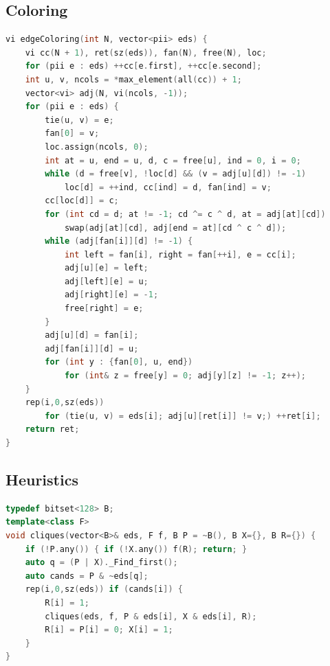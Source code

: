 \begin{multicols}{\Columns}
\subsection{Coloring}
\begin{lstlisting}[language=C++]
vi edgeColoring(int N, vector<pii> eds) {
	vi cc(N + 1), ret(sz(eds)), fan(N), free(N), loc;
	for (pii e : eds) ++cc[e.first], ++cc[e.second];
	int u, v, ncols = *max_element(all(cc)) + 1;
	vector<vi> adj(N, vi(ncols, -1));
	for (pii e : eds) {
		tie(u, v) = e;
		fan[0] = v;
		loc.assign(ncols, 0);
		int at = u, end = u, d, c = free[u], ind = 0, i = 0;
		while (d = free[v], !loc[d] && (v = adj[u][d]) != -1)
			loc[d] = ++ind, cc[ind] = d, fan[ind] = v;
		cc[loc[d]] = c;
		for (int cd = d; at != -1; cd ^= c ^ d, at = adj[at][cd])
			swap(adj[at][cd], adj[end = at][cd ^ c ^ d]);
		while (adj[fan[i]][d] != -1) {
			int left = fan[i], right = fan[++i], e = cc[i];
			adj[u][e] = left;
			adj[left][e] = u;
			adj[right][e] = -1;
			free[right] = e;
		}
		adj[u][d] = fan[i];
		adj[fan[i]][d] = u;
		for (int y : {fan[0], u, end})
			for (int& z = free[y] = 0; adj[y][z] != -1; z++);
	}
	rep(i,0,sz(eds))
		for (tie(u, v) = eds[i]; adj[u][ret[i]] != v;) ++ret[i];
	return ret;
}
\end{lstlisting}


\subsection{Heuristics}
\begin{lstlisting}[language=C++]
typedef bitset<128> B;
template<class F>
void cliques(vector<B>& eds, F f, B P = ~B(), B X={}, B R={}) {
	if (!P.any()) { if (!X.any()) f(R); return; }
	auto q = (P | X)._Find_first();
	auto cands = P & ~eds[q];
	rep(i,0,sz(eds)) if (cands[i]) {
		R[i] = 1;
		cliques(eds, f, P & eds[i], X & eds[i], R);
		R[i] = P[i] = 0; X[i] = 1;
	}
}
\end{lstlisting}


\end{multicols}

